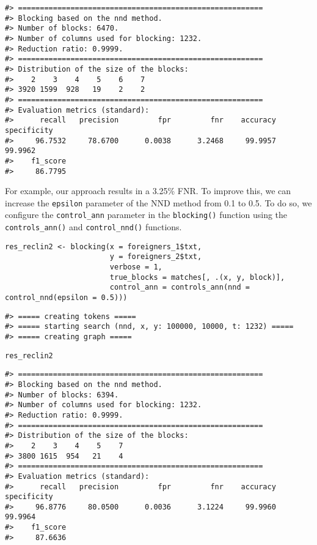\begin{verbatim}
#> ========================================================
#> Blocking based on the nnd method.
#> Number of blocks: 6470.
#> Number of columns used for blocking: 1232.
#> Reduction ratio: 0.9999.
#> ========================================================
#> Distribution of the size of the blocks:
#>    2    3    4    5    6    7
#> 3920 1599  928   19    2    2
#> ========================================================
#> Evaluation metrics (standard):
#>      recall   precision         fpr         fnr    accuracy specificity
#>     96.7532     78.6700      0.0038      3.2468     99.9957     99.9962
#>    f1_score
#>     86.7795
\end{verbatim}

For example, our approach results in a
3.25\% FNR.
To improve this, we can increase the \texttt{epsilon} parameter of
the NND method from 0.1 to 0.5. To do so, we configure the \texttt{control\_ann}
parameter in the \texttt{blocking()} function using the \texttt{controls\_ann()} and
\texttt{control\_nnd()} functions.

\begin{verbatim}
res_reclin2 <- blocking(x = foreigners_1$txt,
                        y = foreigners_2$txt,
                        verbose = 1,
                        true_blocks = matches[, .(x, y, block)],
                        control_ann = controls_ann(nnd = control_nnd(epsilon = 0.5)))
\end{verbatim}

\begin{verbatim}
#> ===== creating tokens =====
#> ===== starting search (nnd, x, y: 100000, 10000, t: 1232) =====
#> ===== creating graph =====
\end{verbatim}

\begin{verbatim}
res_reclin2
\end{verbatim}

\begin{verbatim}
#> ========================================================
#> Blocking based on the nnd method.
#> Number of blocks: 6394.
#> Number of columns used for blocking: 1232.
#> Reduction ratio: 0.9999.
#> ========================================================
#> Distribution of the size of the blocks:
#>    2    3    4    5    7
#> 3800 1615  954   21    4
#> ========================================================
#> Evaluation metrics (standard):
#>      recall   precision         fpr         fnr    accuracy specificity
#>     96.8776     80.0500      0.0036      3.1224     99.9960     99.9964
#>    f1_score
#>     87.6636
\end{verbatim}


